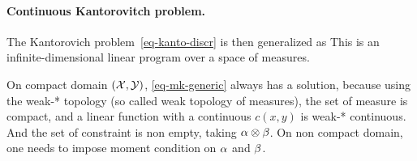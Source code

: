 \paragraph{Continuous Kantorovitch problem.}


The Kantorovich problem~\eqref{eq-kanto-discr} is then generalized as 
This is an infinite-dimensional linear program over a space of measures. 







On compact domain $(\mathcal{X},\mathcal{Y})$, \eqref{eq-mk-generic} always has a solution, because using the weak-* topology (so called weak topology of measures), the set of measure is compact, and a linear function with a continuous $c(x,y)$ is weak-* continuous. And the set of constraint is non empty, taking $\alpha \otimes \beta$. On non compact domain, one needs to impose moment condition on $\alpha$ and $\beta$.

